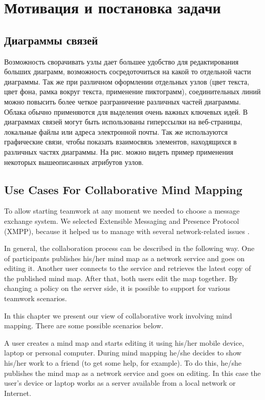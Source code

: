 \newpage

\chapter{Мотивация и постановка задачи}\label{ch:chapter_1}

\section{Диаграммы связей}

Возможность сворачивать узлы дает большее удобство для редактирования больших
диаграмм, возможность сосредоточиться на какой то отдельной части диаграммы. Так
же при различном оформлении отдельных узлов (цвет текста, цвет фона, рамка
вокруг текста, применение пиктограмм), соединительных линий можно повысить более
четкое разграничение различных частей диаграммы. Облака обычно применяются для
выделения очень важных ключевых идей. В диаграммах связей могут быть
использованы гиперссылки на веб-страницы, локальные файлы или адреса электронной
почты. Так же используются графические связи, чтобы показать взаимосвязь
элементов, находящихся в различных частях диаграммы. На рис. можно видеть пример
применения некоторых вышеописанных атрибутов узлов.


\section{Use Cases For Collaborative Mind Mapping}
\label{collaboration-consept}

To allow starting teamwork at any moment we needed to choose a message exchange
system. We selected Extensible Messaging and Presence Protocol (XMPP), because
it helped us to manage with several network-related issues
\cite{hivemind-8th-fruct}.

In general, the collaboration process can be described in the following way. One
of participants publishes his/her mind map as a network service and goes on
editing it. Another user connects to the service and retrieves the latest copy
of the published mind map. After that, both users edit the map together. By
changing a policy on the server side, it is possible to support for various
teamwork scenarios.


In this chapter we present our view of collaborative work involving mind
mapping. There are some possible scenarios below.

A user creates a mind map and starts editing it using his/her mobile device,
laptop or personal computer. During mind mapping he/she decides to show his/her
work to a friend (to get some help, for example).  To do this, he/she publishes
the mind map as a network service and goes on editing. In this case the user's
device or laptop works as a server available from a local network or Internet.

